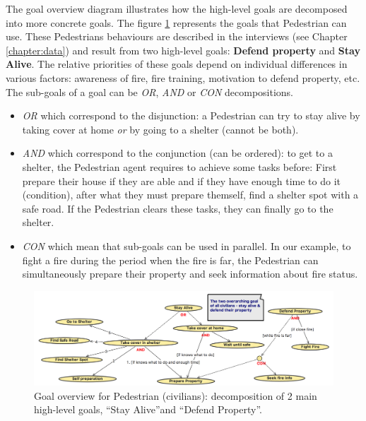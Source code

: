 \documentclass[12pt, a4paper]{memoir} %
\begin{document}
				The goal overview diagram illustrates how the high-level goals are decomposed into more concrete goals.
				The figure \ref{fig:goal-overview} represents the goals that Pedestrian can use. These Pedestrians behaviours are
				described in the interviews (see Chapter \ref{chapter:data}) and result from two high-level goals:
				\textbf{Defend property} and \textbf{Stay Alive}. The relative priorities of these goals depend on individual differences
				in various factors: awareness of fire, fire training, motivation to defend property, etc. The sub-goals of a goal can be
				\textit{OR}, \textit{AND} or \textit{CON} decompositions.
				\begin{itemize}
					\item \textit{OR} which correspond to the disjunction: a Pedestrian can try to stay alive by taking cover at home
						\textit{or} by going to a shelter (cannot be both).
					\item \textit{AND} which correspond to the conjunction (can be ordered): to get to a shelter, the Pedestrian agent requires to
						achieve some tasks before: First prepare their house if they are able and if they have enough time to do it (condition), after what
						they must prepare themself, find a shelter spot with a safe road. If the Pedestrian clears these tasks, they can finally go to the
						shelter.
					\item \textit{CON} which mean that sub-goals can be used in parallel. In our example, to fight a fire during the period
						when the fire is far, the Pedestrian can simultaneously prepare their property and seek information about fire status.
				\end{itemize}

				\begin{figure}
					\begin{center}
						\includegraphics[scale=0.4]{GoalOverview.png}
						\caption{\label{fig:goal-overview}Goal overview for Pedestrian (civilians): decomposition of 2 main high-level goals,
						\textquotedblleft Stay Alive\textquotedblright and \textquotedblleft Defend Property\textquotedblright.}
					\end{center}
				\end{figure}
\end{document}
